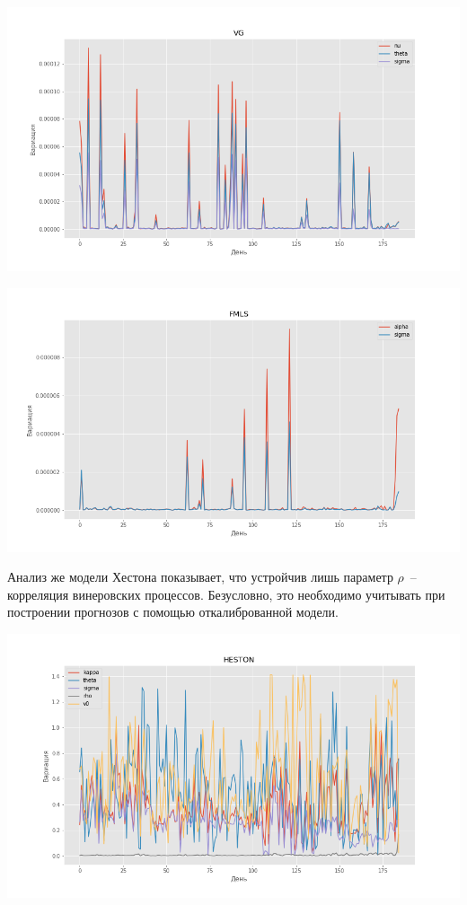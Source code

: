 \documentclass[oneside, final, 12pt]{article}
\begin{document}
\begin{center}
  \includegraphics[width=1\linewidth]{img/vg_stable.png}
\end{center}

\begin{center}
  \includegraphics[width=1\linewidth]{img/ls_stable.png}
\end{center}


\newpage
Анализ же модели Хестона показывает, что устройчив лишь параметр $\rho$~-- корреляция винеровских процессов.
Безусловно, это необходимо учитывать при построении прогнозов с помощью откалиброванной модели. 

\begin{center}
  \includegraphics[width=1\linewidth]{img/heston_stable.png}
\end{center}
\end{document}

